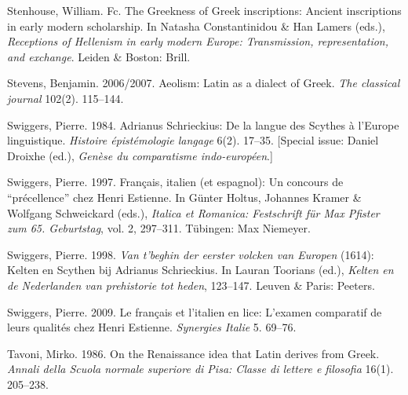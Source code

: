 \begin{styleStandard}
Stenhouse, William. Fc. The Greekness of Greek inscriptions: Ancient inscriptions in early modern scholarship. In Natasha Constantinidou \& Han Lamers (eds.), \textit{Receptions of Hellenism in early modern Europe: Transmission, representation, and exchange}. Leiden \& Boston: Brill.
\end{styleStandard}

\begin{styleStandard}
Stevens, Benjamin. 2006/2007. Aeolism: Latin as a dialect of Greek. \textit{The classical journal} 102(2). 115–144.
\end{styleStandard}

\begin{styleStandard}
Swiggers, Pierre. 1984. Adrianus Schrieckius: De la langue des Scythes à l’Europe linguistique. \textit{Histoire épistémologie langage} 6(2). 17–35. [Special issue: Daniel Droixhe (ed.), \textit{Genèse du comparatisme indo-européen}.]
\end{styleStandard}

\begin{styleStandard}
Swiggers, Pierre. 1997. Français, italien (et espagnol): Un concours de “précellence” chez Henri Estienne. In Günter Holtus, Johannes Kramer \& Wolfgang Schweickard (eds.), \textit{Italica et Romanica: Festschrift für Max Pfister zum 65. Geburtstag}, vol. 2, 297–311. Tübingen: Max Niemeyer.
\end{styleStandard}

\begin{styleStandard}
Swiggers, Pierre. 1998. \textit{Van t’beghin der eerster volcken van Europen} (1614): Kelten en Scythen bij Adrianus Schrieckius. In Lauran Toorians (ed.), \textit{Kelten en de Nederlanden van prehistorie tot heden}, 123–147. Leuven \& Paris: Peeters.
\end{styleStandard}

\begin{styleStandard}
Swiggers, Pierre. 2009. Le français et l’italien en lice: L’examen comparatif de leurs qualités chez Henri Estienne. \textit{Synergies Italie} 5. 69–76.
\end{styleStandard}

\begin{styleStandard}
Tavoni, Mirko. 1986. On the Renaissance idea that Latin derives from Greek. \textit{Annali della Scuola normale superiore di Pisa: Classe di lettere e filosofia} 16(1). 205–238.
\end{styleStandard}

